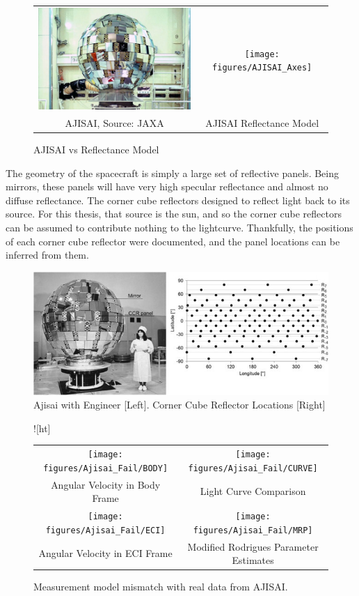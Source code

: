 \begin{figure}
	\begin{tabular}{cc}
	\includegraphics[width = 90mm]{figures/ajisai.jpg} & \texttt{[image: figures/AJISAI\_Axes]} \\
	AJISAI, Source: JAXA & AJISAI Reflectance Model
	\end{tabular}
	\caption{AJISAI vs Reflectance Model}
\end{figure}



The geometry of the spacecraft is simply a large set of reflective panels. Being mirrors, these panels will have very high specular reflectance and almost no diffuse reflectance. The corner cube reflectors designed to reflect light back to its source. For this thesis, that source is the sun, and so the corner cube reflectors can be assumed to contribute nothing to the lightcurve. Thankfully, the positions of each corner cube reflector were documented, and the panel locations can be inferred from them.

\begin{figure}[ht]
	\centering
	\includegraphics[width = 150mm]{figures/ajisai_panels.jpg}
	\caption{Ajisai with Engineer [Left]. Corner Cube Reflector Locations [Right] \cite{ajisai}}
\end{figure}

\begin{figure}![ht]
	\begin{tabular}{cc}
		\texttt{[image: figures/Ajisai\_Fail/BODY]} &
		\texttt{[image: figures/Ajisai\_Fail/CURVE]} \\
		Angular Velocity in Body Frame & Light Curve Comparison \\
		\texttt{[image: figures/Ajisai\_Fail/ECI]} &
		\texttt{[image: figures/Ajisai\_Fail/MRP]} \\
		Angular Velocity in ECI Frame & Modified Rodrigues Parameter Estimates
	\end{tabular}
	\caption{Measurement model mismatch with real data from AJISAI.}
\end{figure}

